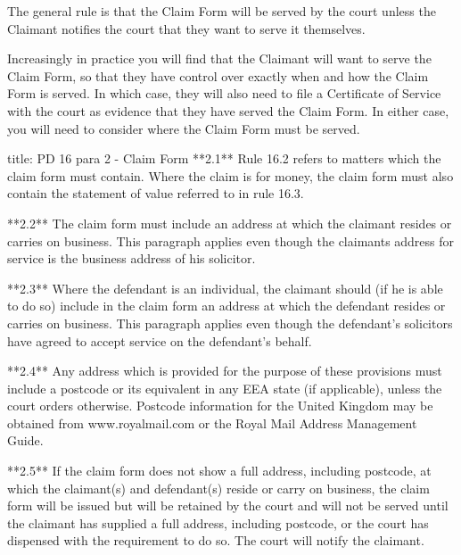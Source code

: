 \documentclass[
]{article}
\newenvironment{Shaded}{}{}
\newcommand{\NormalTok}[1]{#1}
\begin{document}
The general rule is that the Claim Form will be served by the court
unless the Claimant notifies the court that they want to serve it
themselves.

Increasingly in practice you will find that the Claimant will want to
serve the Claim Form, so that they have control over exactly when and
how the Claim Form is served. In which case, they will also need to file
a Certificate of Service with the court as evidence that they have
served the Claim Form. In either case, you will need to consider where
the Claim Form must be served.

\begin{Shaded}
\begin{Highlighting}[]
\NormalTok{title: PD 16 para 2 {-} Claim Form}
\NormalTok{**2.1** Rule 16.2 refers to matters which the claim form must contain. Where the claim is for money, the claim form must also contain the statement of value referred to in rule 16.3.}

\NormalTok{**2.2** The claim form must include an address at which the claimant resides or carries on business. This paragraph applies even though the claimant\textquotesingle{}s address for service is the business address of his solicitor.}

\NormalTok{**2.3** Where the defendant is an individual, the claimant should (if he is able to do so) include in the claim form an address at which the defendant resides or carries on business. This paragraph applies even though the defendant’s solicitors have agreed to accept service on the defendant’s behalf.}

\NormalTok{**2.4** Any address which is provided for the purpose of these provisions must include a postcode or its equivalent in any EEA state (if applicable), unless the court orders otherwise. Postcode information for the United Kingdom may be obtained from www.royalmail.com or the Royal Mail Address Management Guide.}

\NormalTok{**2.5** If the claim form does not show a full address, including postcode, at which the claimant(s) and defendant(s) reside or carry on business, the claim form will be issued but will be retained by the court and will not be served until the claimant has supplied a full address, including postcode, or the court has dispensed with the requirement to do so. The court will notify the claimant.}


\end{Highlighting}
\end{Shaded}
\end{document}
